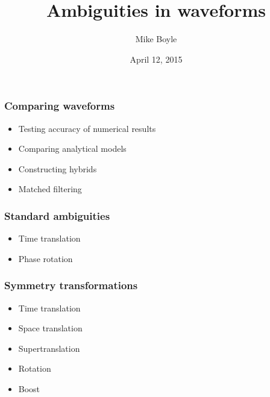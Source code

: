 \documentclass[12pt,xcolor={dvipsnames}]{beamer}
\title{Ambiguities in waveforms}
\author[Mike Boyle] {Mike Boyle}
\institute{APS}
\date{April 12, 2015}
\begin{document}
\begin{frame}[plain]
  \titlepage
\end{frame}




\begin{frame}
  \frametitle{Comparing waveforms}
  \begin{itemize}
  \item Testing accuracy of numerical results
  \item Comparing analytical models
  \item Constructing hybrids
  \item Matched filtering
  \end{itemize}
\end{frame}

\begin{frame}
  \frametitle{Standard ambiguities}
  \begin{itemize}
  \item Time translation
  \item Phase rotation
  \end{itemize}
\end{frame}

\begin{frame}
  \frametitle{Symmetry transformations}
  \begin{itemize}
  \item Time translation
  \item Space translation
  \item Supertranslation
  \item Rotation
  \item Boost
  \end{itemize}
\end{frame}
\end{document}
